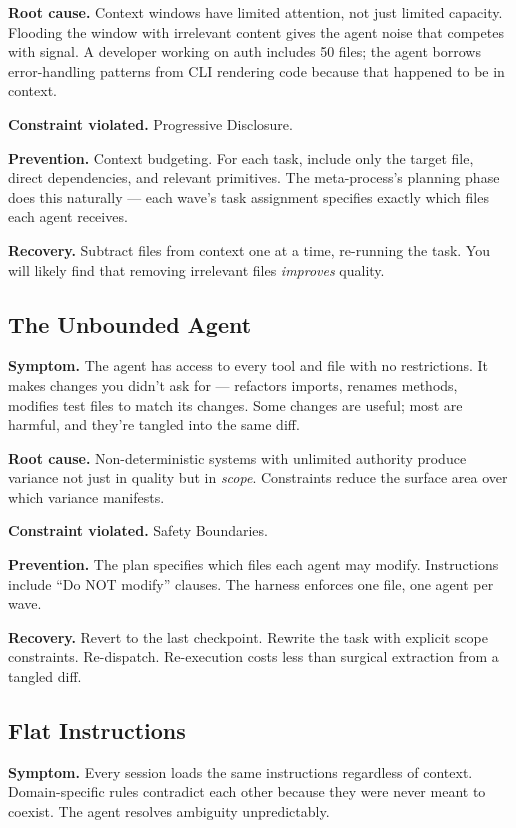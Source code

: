 \documentclass[
  a4paper,
  DIV=11,
  numbers=noendperiod]{scrreprt}
\begin{document}
\textbf{Root cause.} Context windows have limited attention, not just
limited capacity. Flooding the window with irrelevant content gives the
agent noise that competes with signal. A developer working on auth
includes 50 files; the agent borrows error-handling patterns from CLI
rendering code because that happened to be in context.

\textbf{Constraint violated.} Progressive Disclosure.

\textbf{Prevention.} Context budgeting. For each task, include only the
target file, direct dependencies, and relevant primitives. The
meta-process's planning phase does this naturally --- each wave's task
assignment specifies exactly which files each agent receives.

\textbf{Recovery.} Subtract files from context one at a time, re-running
the task. You will likely find that removing irrelevant files
\emph{improves} quality.

\subsection{The Unbounded Agent}\label{the-unbounded-agent}

\textbf{Symptom.} The agent has access to every tool and file with no
restrictions. It makes changes you didn't ask for --- refactors imports,
renames methods, modifies test files to match its changes. Some changes
are useful; most are harmful, and they're tangled into the same diff.

\textbf{Root cause.} Non-deterministic systems with unlimited authority
produce variance not just in quality but in \emph{scope}. Constraints
reduce the surface area over which variance manifests.

\textbf{Constraint violated.} Safety Boundaries.

\textbf{Prevention.} The plan specifies which files each agent may
modify. Instructions include ``Do NOT modify'' clauses. The harness
enforces one file, one agent per wave.

\textbf{Recovery.} Revert to the last checkpoint. Rewrite the task with
explicit scope constraints. Re-dispatch. Re-execution costs less than
surgical extraction from a tangled diff.

\subsection{Flat Instructions}\label{flat-instructions}

\textbf{Symptom.} Every session loads the same instructions regardless
of context. Domain-specific rules contradict each other because they
were never meant to coexist. The agent resolves ambiguity unpredictably.
\end{document}
